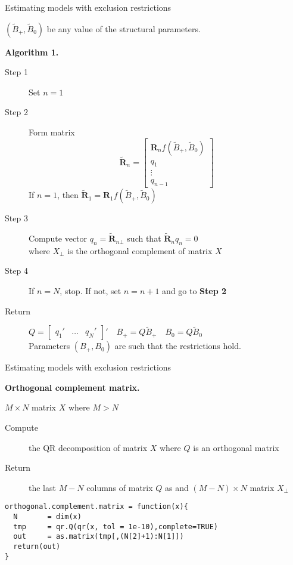 \documentclass[notes,blackandwhite,mathsans,usenames,dvipsnames]{beamer}
\begin{document}
\begin{frame}{Estimating models with exclusion restrictions}

 $(\tilde{B}_+,\tilde{B}_0)$ {\color{mcxs2}be any value of the structural parameters.}

\bigskip\textbf{Algorithm 1.}\small
\begin{description}
\item[Step 1] {\color{mcxs2}Set} $n=1$
\item[Step 2] {\color{mcxs2}Form matrix} 
$$ \tilde{\mathbf{R}}_n = \begin{bmatrix} \mathbf{R}_nf(\tilde{B}_+,\tilde{B}_0) \\ q_1 \\ \vdots \\q_{n-1} \end{bmatrix} $$
{\color{mcxs2}If} $n=1${\color{mcxs2}, then} $\tilde{\mathbf{R}}_1 = \mathbf{R}_1f(\tilde{B}_+,\tilde{B}_0)$
\item[Step 3] {\color{mcxs2}Compute vector} $q_n=\tilde{\mathbf{R}}_{n\bot}$ {\color{mcxs2}such that} $\tilde{\mathbf{R}}_nq_n=0$\\ {\color{mcxs2}where} $X_{\bot}$ {\color{mcxs2}is the orthogonal complement of matrix} $X$ 
\item[Step 4] {\color{mcxs2}If} $n=N${\color{mcxs2}, stop. If not, set} $n=n+1$ {\color{mcxs2}and go to} \textbf{Step 2}
\item[Return] $Q=\begin{bmatrix} q_1' & \dots & q_N' \end{bmatrix}'\quad B_+ = Q\tilde{B}_+ \quad B_0=Q\tilde{B}_0$\\
{\color{mcxs2}Parameters} $(B_+,B_0)$ {\color{mcxs2}are such that the restrictions hold.}
\end{description}
\end{frame}



\begin{frame}[fragile]{Estimating models with exclusion restrictions}

\textbf{Orthogonal complement matrix.}

 $M\times N$ {\color{mcxs2}matrix} $X$ {\color{mcxs2}where} $M>N$ 
\begin{description}
\item[Compute] {\color{mcxs2}the} {\color{purple}QR decomposition} {\color{mcxs2}of matrix} $X$ {\color{mcxs2}where} $Q$ {\color{mcxs2}is an orthogonal matrix}
\item[Return] {\color{mcxs2}the last} $M-N$ {\color{mcxs2}columns of matrix} $Q$ {\color{mcxs2}as and} $(M-N)\times N$ {\color{mcxs2}matrix} $X_{\bot}$
\end{description}

\begin{verbatim}
orthogonal.complement.matrix = function(x){
  N       = dim(x)
  tmp     = qr.Q(qr(x, tol = 1e-10),complete=TRUE)
  out     = as.matrix(tmp[,(N[2]+1):N[1]])
  return(out)
}
\end{verbatim}
\end{frame}
\end{document}
